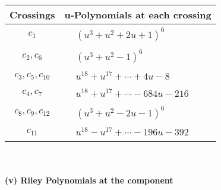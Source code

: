 \documentclass[1p]{elsarticle_modified}
\theoremstyle{definition}
\begin{document}
\begin{tabular}{m{50pt}|m{274pt}}
Crossings & \hspace{64pt}u-Polynomials at each crossing \\
\hline $$\begin{aligned}c_{1}\end{aligned}$$&$\begin{aligned}
&(u^3+u^2+2 u+1)^6
\end{aligned}$\\
\hline $$\begin{aligned}c_{2},c_{6}\end{aligned}$$&$\begin{aligned}
&(u^3+u^2-1)^6
\end{aligned}$\\
\hline $$\begin{aligned}c_{3},c_{5},c_{10}\end{aligned}$$&$\begin{aligned}
&u^{18}+u^{17}+\cdots+4 u-8
\end{aligned}$\\
\hline $$\begin{aligned}c_{4},c_{7}\end{aligned}$$&$\begin{aligned}
&u^{18}+u^{17}+\cdots-684 u-216
\end{aligned}$\\
\hline $$\begin{aligned}c_{8},c_{9},c_{12}\end{aligned}$$&$\begin{aligned}
&(u^3+u^2-2 u-1)^6
\end{aligned}$\\
\hline $$\begin{aligned}c_{11}\end{aligned}$$&$\begin{aligned}
&u^{18}- u^{17}+\cdots-196 u-392
\end{aligned}$\\
\hline
\end{tabular}\\~\\
\newpage\renewcommand{\arraystretch}{1}
\flushleft \textbf{(v) Riley Polynomials at the component}\newline \\
\end{document}
